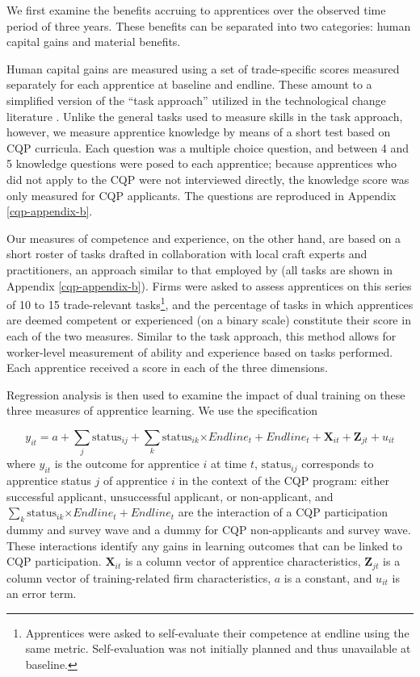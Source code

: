 \documentclass[
  a4paper, twoside, 12pt]{book}
\begin{document}
We first examine the benefits accruing to apprentices over the observed time period of three years. These benefits can be separated into two categories: human capital gains and material benefits.

Human capital gains are measured using a set of trade-specific scores measured separately for each apprentice at baseline and endline. These amount to a simplified version of the ``task approach'' utilized in the technological change literature \autocites[see][]{dicarlo2016,crepon2019}. Unlike the general tasks used to measure skills in the task approach, however, we measure apprentice knowledge by means of a short test based on CQP curricula. Each question was a multiple choice question, and between 4 and 5 knowledge questions were posed to each apprentice; because apprentices who did not apply to the CQP were not interviewed directly, the knowledge score was only measured for CQP applicants. The questions are reproduced in Appendix \ref{cqp-appendix-b}.

Our measures of competence and experience, on the other hand, are based on a short roster of tasks drafted in collaboration with local craft experts and practitioners, an approach similar to that employed by \textcite{hardy2019} (all tasks are shown in Appendix \ref{cqp-appendix-b}). Firms were asked to assess apprentices on this series of 10 to 15 trade-relevant tasks\footnote{Apprentices were asked to self-evaluate their competence at endline using the same metric. Self-evaluation was not initially planned and thus unavailable at baseline.}, and the percentage of tasks in which apprentices are deemed competent or experienced (on a binary scale) constitute their score in each of the two measures. Similar to the task approach, this method allows for worker-level measurement of ability and experience based on tasks performed. Each apprentice received a score in each of the three dimensions.

Regression analysis is then used to examine the impact of dual training on these three measures of apprentice learning. We use the specification

\[ y_{it} = a+\sum_{j}\text{status}_{ij}+\sum_{k}\text{status}_{ik}\text{×}Endline_t+{Endline}_t+\mathbf{X}_{it}+\mathbf{Z}_{jt}+u_{it} \]
where \(y_{it}\) is the outcome for apprentice \(i\) at time \(t\), \(\text{status}_{ij}\) corresponds to apprentice status \(j\) of apprentice \(i\) in the context of the CQP program: either successful applicant, unsuccessful applicant, or non-applicant, and \(\sum_{k}\text{status}_{ik}\text{×}Endline_t+{Endline}_t\) are the interaction of a CQP participation dummy and survey wave and a dummy for CQP non-applicants and survey wave. These interactions identify any gains in learning outcomes that can be linked to CQP participation. \(\mathbf{X}_{it}\) is a column vector of apprentice characteristics, \(\mathbf{Z}_{jt}\) is a column vector of training-related firm characteristics, \(a\) is a constant, and \(u_{it}\) is an error term.
\end{document}
